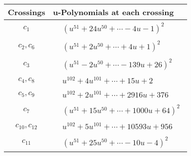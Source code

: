 \documentclass[1p]{elsarticle_modified}
\theoremstyle{definition}
\begin{document}
\begin{tabular}{m{50pt}|m{274pt}}
Crossings & \hspace{64pt}u-Polynomials at each crossing \\
\hline $$\begin{aligned}c_{1}\end{aligned}$$&$\begin{aligned}
&(u^{51}+24 u^{50}+\cdots-4 u-1)^{2}
\end{aligned}$\\
\hline $$\begin{aligned}c_{2},c_{6}\end{aligned}$$&$\begin{aligned}
&(u^{51}+2 u^{50}+\cdots+4 u+1)^{2}
\end{aligned}$\\
\hline $$\begin{aligned}c_{3}\end{aligned}$$&$\begin{aligned}
&(u^{51}-2 u^{50}+\cdots-139 u+26)^{2}
\end{aligned}$\\
\hline $$\begin{aligned}c_{4},c_{8}\end{aligned}$$&$\begin{aligned}
&u^{102}+4 u^{101}+\cdots+15 u+2
\end{aligned}$\\
\hline $$\begin{aligned}c_{5},c_{9}\end{aligned}$$&$\begin{aligned}
&u^{102}+2 u^{101}+\cdots+2916 u+376
\end{aligned}$\\
\hline $$\begin{aligned}c_{7}\end{aligned}$$&$\begin{aligned}
&(u^{51}+15 u^{50}+\cdots+1000 u+64)^{2}
\end{aligned}$\\
\hline $$\begin{aligned}c_{10},c_{12}\end{aligned}$$&$\begin{aligned}
&u^{102}+5 u^{101}+\cdots+10593 u+956
\end{aligned}$\\
\hline $$\begin{aligned}c_{11}\end{aligned}$$&$\begin{aligned}
&(u^{51}+25 u^{50}+\cdots-10 u-4)^{2}
\end{aligned}$\\
\hline
\end{tabular}\\~\\
\end{document}
